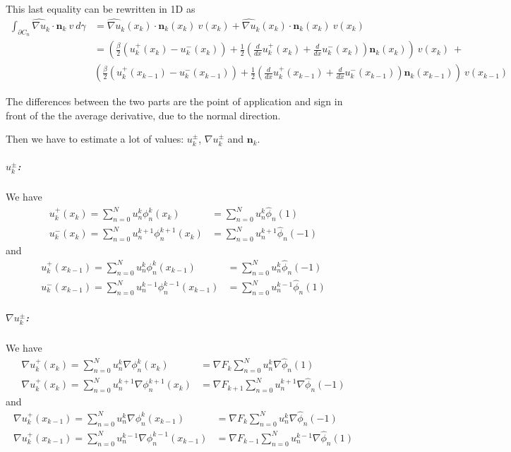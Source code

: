 \documentclass[a4paper,10pt]{article}
\begin{document}
This last equality can be rewritten in 1D as
\begin{align*}
 \int_{\partial C_n} \widehat{\nabla u}_k \cdot \mathbf{n}_k\ v\ d\gamma &= \widehat{\nabla 
u}_k(x_k) \cdot \mathbf{n}_k(x_k)\ v(x_k) + \widehat{\nabla u}_k(x_k) \cdot \mathbf{n}_k(x_k)\ 
v(x_k)\\
 &=\left(\frac{\beta}{2} (u^+_k(x_k) - u^-_k(x_k)) + \frac{1}{2} \left(\frac{d}{dx} u^+_k(x_k) + 
\frac{d}{dx} u^-_k(x_k)\right) \mathbf{n}_k(x_k) \right)\ v(x_k) \ + \\
& \left(\frac{\beta}{2} (u^+_k(x_{k-1}) - u^-_k(x_{k-1})) + \frac{1}{2} \left(\frac{d}{dx} 
u^+_k(x_{k-1}) + \frac{d}{dx} u^-_k(x_{k-1})\right)\mathbf{n}_k(x_{k-1}) \right)\ v(x_{k-1})
\end{align*}

The differences between the two parts are the point of application and sign in front of the the 
average derivative, due to the normal direction.

Then we have to estimate a lot of values: $u^\pm_k$, $\nabla u^\pm_k$ and $\mathbf{n}_k$.

\subparagraph{$u^\pm_k$:}
We have
\begin{align*}
 u^+_k(x_k) = \sum_{n=0}^N u_n^k \phi_n^k(x_k) &= \sum_{n=0}^N u_n^k \hat \phi_n(1) \\
 u^-_k(x_k) = \sum_{n=0}^N u_n^{k+1} \phi_n^{k+1}(x_k) &= \sum_{n=0}^N u_n^{k+1} \hat 
\phi_n(-1)
\end{align*}
and
\begin{align*}
 u^+_k(x_{k-1}) = \sum_{n=0}^N u_n^k \phi_n^k(x_{k-1}) &= \sum_{n=0}^N u_n^k \hat \phi_n(-1) 
\\
 u^-_k(x_{k-1}) = \sum_{n=0}^N u_n^{k-1} \phi_n^{k-1}(x_{k-1}) &= \sum_{n=0}^N u_n^{k-1} \hat 
\phi_n(1)
\end{align*}

\subparagraph{$\nabla u^\pm_k$:} We have
\begin{align*}
 \nabla u^+_k(x_k) = \sum_{n=0}^N u_n^k \nabla \phi_n^k(x_k) &= \nabla F_k \sum_{n=0}^N 
u_n^k \nabla \hat \phi_n(1) \\
\nabla u^+_k(x_k) = \sum_{n=0}^N u_n^{k+1} \nabla \phi_n^{k+1}(x_k) &= \nabla F_{k+1} 
\sum_{n=0}^N u_n^{k+1} \nabla \hat \phi_n(-1)
\end{align*}
and
\begin{align*}
 \nabla u^+_k(x_{k-1}) = \sum_{n=0}^N u_n^k \nabla \phi_n^k(x_{k-1}) &= \nabla F_k \sum_{n=0}^N 
u_n^k \nabla \hat \phi_n(-1) \\
\nabla u^+_k(x_{k-1}) = \sum_{n=0}^N u_n^{k-1} \nabla \phi_n^{k-1}(x_{k-1}) &= \nabla F_{k-1} 
\sum_{n=0}^N 
u_n^{k-1} \nabla \hat \phi_n(1)
\end{align*}
\end{document}
